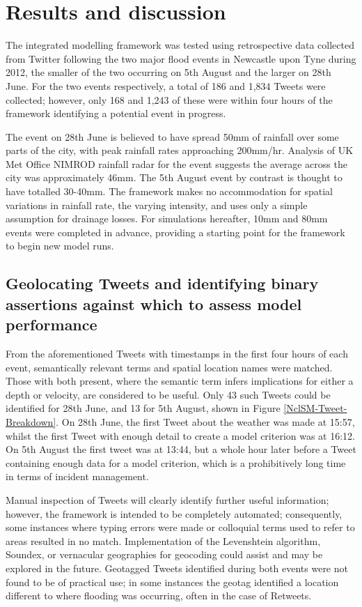 \section{Results and discussion}

The integrated modelling framework was tested using retrospective data collected from Twitter following the two major flood events in Newcastle upon Tyne during 2012, the smaller of the two occurring on 5th August and the larger on 28th June. For the two events respectively, a total of 186 and 1,834 Tweets were collected; however, only 168 and 1,243 of these were within four hours of the framework identifying a potential event in progress.

The event on 28th June is believed to have spread 50mm of rainfall over some parts of the city, with peak rainfall rates approaching 200mm/hr. Analysis of UK Met Office NIMROD rainfall radar for the event suggests the average across the city was approximately 46mm. The 5th August event by contrast is thought to have totalled 30-40mm. The framework makes no accommodation for spatial variations in rainfall rate, the varying intensity, and uses only a simple assumption for drainage losses. For simulations hereafter, 10mm and 80mm events were completed in advance, providing a starting point for the framework to begin new model runs. 

\subsection{Geolocating Tweets and identifying binary assertions against which to assess model performance}

From the aforementioned Tweets with timestamps in the first four hours of each event, semantically relevant terms and spatial location names were matched. Those with both present, where the semantic term infers implications for either a depth or velocity, are considered to be useful. Only 43 such Tweets could be identified for 28th June, and 13 for 5th August, shown in Figure \ref{NclSM-Tweet-Breakdown}. On 28th June, the first Tweet about the weather was made at 15:57, whilst the first Tweet with enough detail to create a model criterion was at 16:12. On 5th August the first tweet was at 13:44, but a whole hour later before a Tweet containing enough data for a model criterion, which is a prohibitively long time in terms of incident management.

Manual inspection of Tweets will clearly identify further useful information; however, the framework is intended to be completely automated; consequently, some instances where typing errors were made or colloquial terms used to refer to areas resulted in no match. Implementation of the Levenshtein algorithm, Soundex, or vernacular geographies for geocoding could assist and may be explored in the future. Geotagged Tweets identified during both events were not found to be of practical use; in some instances the geotag identified a location different to where flooding was occurring, often in the case of Retweets. 

